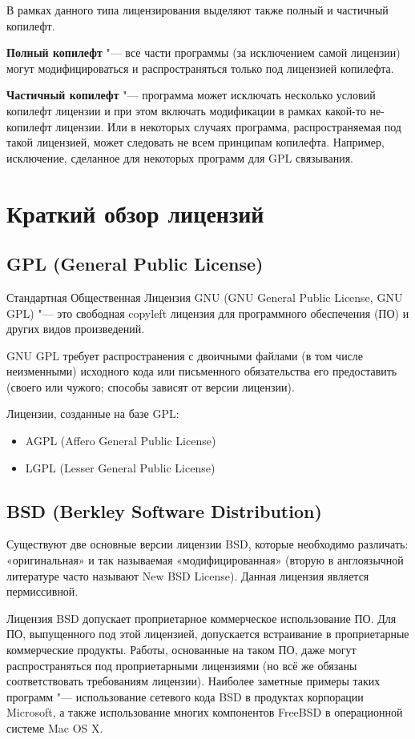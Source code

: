 \documentclass[10pt, a5paper]{article}
\begin{document}
В рамках данного типа лицензирования выделяют также полный и частичный копилефт.

\textbf{Полный копилефт} "--- все части программы (за исключением самой лицензии) могут модифицироваться и распространяться только под лицензией копилефта.

\textbf{Частичный копилефт} "--- программа может исключать несколько условий копилефт лицензии и при этом включать модификации в рамках какой-то не-копилефт лицензии. Или в некоторых случаях программа, распространяемая под такой лицензией, может следовать не всем принципам копилефта. Например, исключение, сделанное для некоторых программ для GPL связывания.

\section*{Краткий обзор лицензий}

\subsection*{GPL (General Public License)}

Стандартная Общественная Лицензия GNU (GNU General Public License, GNU GPL) "--- это свободная copyleft лицензия для программного обеспечения (ПО) и других видов произведений\footnotemark[1].

GNU GPL требует распространения с двоичными файлами (в том числе неизменными) исходного кода или письменного обязательства его предоставить (своего или чужого; способы зависят от версии лицензии).

Лицензии, созданные на базе GPL:
\begin{itemize}
  \item AGPL (Affero General Public License)
  \item LGPL (Lesser General Public License)
\end{itemize}

\subsection*{BSD (Berkley Software Distribution)}

Существуют две основные версии лицензии BSD, которые необходимо различать: «оригинальная» и так называемая «модифицированная» (вторую в англоязычной литературе часто называют New BSD License). Данная лицензия является пермиссивной.

Лицензия BSD допускает проприетарное коммерческое использование ПО. Для ПО, выпущенного под этой лицензией, допускается встраивание в проприетарные коммерческие продукты. Работы, основанные на таком ПО, даже могут распространяться под проприетарными лицензиями (но всё же обязаны соответствовать требованиям лицензии). Наиболее заметные примеры таких программ "--- использование сетевого кода BSD в продуктах корпорации Microsoft, а также использование многих компонентов FreeBSD в операционной системе Mac OS X.
\end{document}
